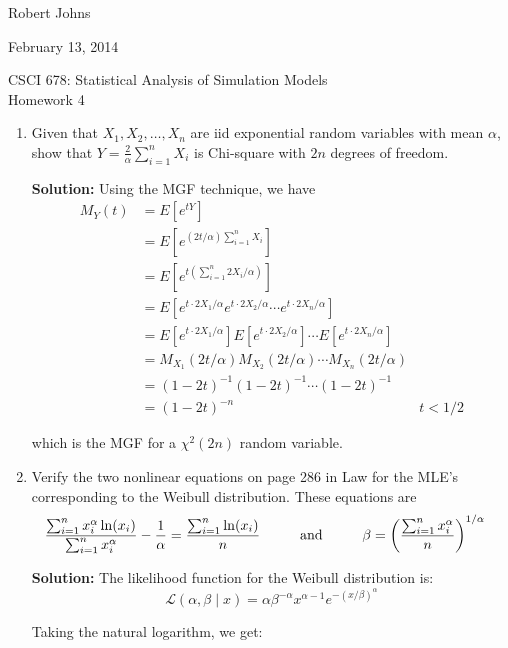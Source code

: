 \documentclass[11pt]{article} %
\newcommand{\inv}{^{-1}}
\newcommand{\tr}{\textrm}
\newcommand{\like}{\mathcal{L}}
\begin{document}
\hfill Robert Johns

\hfill February 13, 2014

\begin{center} {\Large CSCI 678: Statistical Analysis of Simulation Models}\\{\large Homework 4}\end{center}

\begin{enumerate}

\item Given that $X_1, X_2, \ldots, X_n$ are iid exponential random variables with mean $\alpha$, show that $Y = \frac{2}{\alpha}\sum_{i = 1}^n X_i$ is Chi-square with $2n$ degrees of freedom.

{\bf Solution:} Using the MGF technique, we have
\begin{align*}
M_Y(t) &= E[e^{tY}]\\
&= E[e^{(2t/\alpha)\sum_{i = 1}^nX_i}]\\
&= E[e^{t(\sum_{i =1}^n2X_i/\alpha)}]\\
&= E[e^{t\cdot2X_1/\alpha}e^{t\cdot2X_2/\alpha}\cdots e^{t\cdot2X_n/\alpha}]\\
&= E[e^{t\cdot2X_1/\alpha}]E[e^{t\cdot2X_2/\alpha}]\cdots E[e^{t\cdot2X_n/\alpha}]\\
&= M_{X_1}(2t/\alpha)M_{X_2}(2t/\alpha)\cdots M_{X_n}(2t/\alpha)\\
&= (1-2t)\inv(1-2t)\inv\cdots(1-2t)\inv\\
&= (1-2t)^{-n} & t < 1/2
\end{align*}

which is the MGF for a $\chi^2(2n)$ random variable.

\item Verify the two nonlinear equations on page 286 in Law for the MLE's corresponding to the Weibull distribution.  These equations are
\begin{align*}\frac{\sum_{i = 1}^nx_i^\alpha \ln(x_i)}{\sum_{i = 1}^n x_i^\alpha} - \frac{1}{\alpha} = \frac{\sum_{i = 1}^n \ln(x_i)}{n}
&\tr{\hspace{1 cm}and\hspace{1 cm}}
\beta = \left(\frac{\sum_{i = 1}^nx_i^\alpha}{n}\right)^{1/\alpha}\end{align*}

{\bf Solution:} The likelihood function for the Weibull distribution is:
$$\like(\alpha, \beta \;|\;x) = \alpha\beta^{-\alpha}x^{\alpha -1}e^{-(x/\beta)^\alpha}$$

Taking the natural logarithm, we get:


\end{enumerate}
\end{document}
